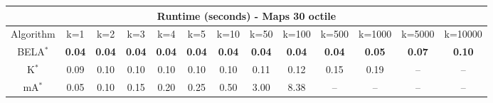 \begin{tabular}{c|cccccccccccc}\toprule
\multicolumn{13}{c}{Runtime (seconds) - Maps 30 octile}\\ \midrule
Algorithm & k=1 & k=2 & k=3 & k=4 & k=5 & k=10 & k=50 & k=100 & k=500 & k=1000 & k=5000 & k=10000 \\ \midrule
BELA$^*$ & \textbf{0.04} & \textbf{0.04} & \textbf{0.04} & \textbf{0.04} & \textbf{0.04} & \textbf{0.04} & \textbf{0.04} & \textbf{0.04} & \textbf{0.04} & \textbf{0.05} & \textbf{0.07} & \textbf{0.10} \\
K$^*$ & 0.09 & 0.10 & 0.10 & 0.10 & 0.10 & 0.10 & 0.11 & 0.12 & 0.15 & 0.19 & -- & -- \\
mA$^*$ & 0.05 & 0.10 & 0.15 & 0.20 & 0.25 & 0.50 & 3.00 & 8.38 & -- & -- & -- & -- \\ \bottomrule 
\end{tabular}
